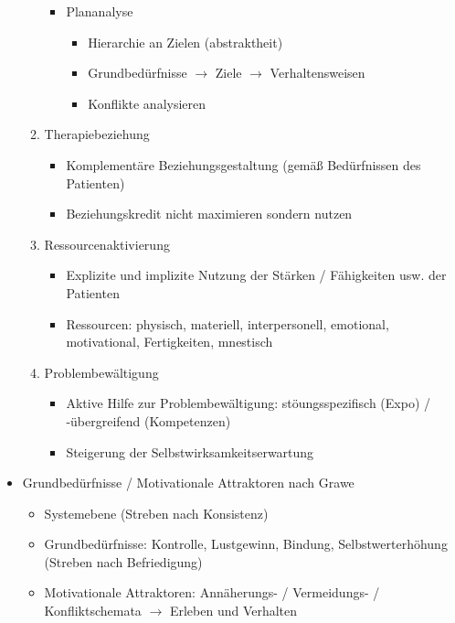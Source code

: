 \documentclass[11pt, paper=a4, twocolumn]{scrartcl}
\begin{document}
\begin{itemize}
\begin{enumerate}
\begin{itemize}
\begin{itemize}
								\end{itemize}
							\item Plananalyse
								\begin{itemize}
									\item Hierarchie an Zielen (abstraktheit)
									\item Grundbedürfnisse $\rightarrow$ Ziele $\rightarrow$ Verhaltensweisen
									\item Konflikte analysieren
								\end{itemize}
						\end{itemize}
					\item Therapiebeziehung
						\begin{itemize}
							\item Komplementäre Beziehungsgestaltung (gemäß Bedürfnissen des Patienten)
							\item Beziehungskredit nicht maximieren sondern nutzen
						\end{itemize}
					\item Ressourcenaktivierung
						\begin{itemize}
							\item Explizite und implizite Nutzung der Stärken / Fähigkeiten usw. der Patienten
							\item Ressourcen: physisch, materiell, interpersonell, emotional, motivational, Fertigkeiten, 
								mnestisch
						\end{itemize}
					\item Problembewältigung
						\begin{itemize}
							\item Aktive Hilfe zur Problembewältigung: stöungsspezifisch (Expo) / -übergreifend 
								(Kompetenzen)
							\item Steigerung der Selbstwirksamkeitserwartung
						\end{itemize}
				\end{enumerate}
			\item Grundbedürfnisse / Motivationale Attraktoren nach Grawe
				\begin{itemize}
					\item Systemebene (Streben nach Konsistenz)
					\item Grundbedürfnisse: Kontrolle, Lustgewinn, Bindung, Selbstwerterhöhung (Streben nach Befriedigung)
					\item Motivationale Attraktoren: Annäherungs- / Vermeidungs- / Konfliktschemata $\rightarrow$ Erleben und 
						Verhalten
				\end{itemize}

\end{itemize}
\end{document}
